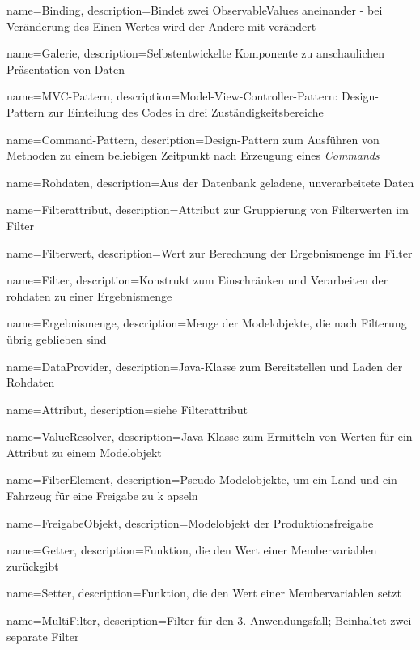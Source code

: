 
 {
	name=Binding,
	description={Bindet zwei ObservableValues aneinander - bei Veränderung des Einen Wertes wird der Andere mit verändert}
}

 {
	name=Galerie,
	description={Selbstentwickelte Komponente zu anschaulichen Präsentation von Daten}
}

 {
	name=MVC-Pattern,
	description={Model-View-Controller-Pattern: Design-Pattern zur Einteilung des Codes in drei Zuständigkeitsbereiche}
}

 {
	name=Command-Pattern,
	description={Design-Pattern zum Ausführen von Methoden zu einem beliebigen Zeitpunkt nach Erzeugung eines \textit{Commands}}
}

 {
	name=Rohdaten,
	description={Aus der Datenbank geladene, unverarbeitete Daten}
}

 {
	name=Filterattribut,
	description={Attribut zur Gruppierung von Filterwerten im Filter}
}

 {
	name=Filterwert,
	description={Wert zur Berechnung der Ergebnismenge im Filter}
}

 {
	name=Filter,
	description={Konstrukt zum Einschränken und Verarbeiten der rohdaten zu einer Ergebnismenge}
}

 {
	name=Ergebnismenge,
	description={Menge der Modelobjekte, die nach Filterung übrig geblieben sind}
}

 {
	name=DataProvider,
	description={Java-Klasse zum Bereitstellen und Laden der Rohdaten}
}

 {
	name=Attribut,
	description={siehe Filterattribut}
}

 {
	name=ValueResolver,
	description={Java-Klasse zum Ermitteln von Werten für ein Attribut zu einem Modelobjekt}
}

 {
	name=FilterElement,
	description={Pseudo-Modelobjekte, um ein Land und ein Fahrzeug für eine Freigabe zu k apseln}
}

 {
	name=FreigabeObjekt,
	description={Modelobjekt der Produktionsfreigabe}
}

 {
	name=Getter,
	description={Funktion, die den Wert einer Membervariablen zurückgibt}
}

 {
	name=Setter,
	description={Funktion, die den Wert einer Membervariablen setzt}
}

 {
	name=MultiFilter,
	description={Filter für den 3. Anwendungsfall; Beinhaltet zwei separate Filter}
}